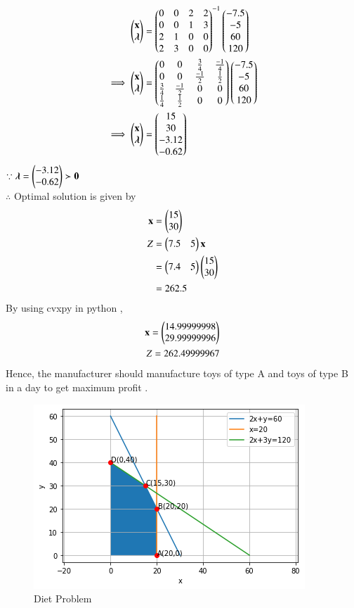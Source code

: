 \documentclass[journal,12pt,twocolumn]{IEEEtran}
\begin{document}
\begin{align}
    \begin{pmatrix}\mathbf{x} \\ \boldsymbol{\lambda}\end{pmatrix} &= \begin{pmatrix}0 & 0 & 2 & 2 \\ 0 & 0 & 1 & 3 \\ 2 & 1 & 0 & 0 \\ 2 & 3 & 0 & 0\end{pmatrix}^{-1}\begin{pmatrix}-7.5 \\ -5 \\ 60 \\ 120\end{pmatrix}
    \\
    \implies   \begin{pmatrix}\mathbf{x} \\ \boldsymbol{\lambda}\end{pmatrix} &= \begin{pmatrix}0 & 0 & \frac{3}{4} & \frac{-1}{4} \\ 0 & 0 & \frac{-1}{2} & \frac{1}{2} \\ \frac{3}{4} & \frac{-1}{2} & 0 & 0 \\ \frac{1}{4} & \frac{1}{2} & 0 & 0\end{pmatrix}\begin{pmatrix}-7.5 \\ -5 \\ 60 \\ 120\end{pmatrix}
    \\
    \implies \begin{pmatrix}\mathbf{x} \\ \boldsymbol{\lambda}\end{pmatrix} &= \begin{pmatrix}15 \\ 30 \\ -3.12 \\ -0.62\end{pmatrix}
\end{align}
$\because \boldsymbol{\lambda}=\begin{pmatrix}-3.12 \\ -0.62\end{pmatrix} \succ \mathbf{0} $
\\
$\therefore$ Optimal solution is given by
\begin{align}
    \mathbf{x} &= \begin{pmatrix}15\\30\end{pmatrix} \\
    Z &= \begin{pmatrix}7.5 & 5\end{pmatrix}\mathbf{x} \\
    &= \begin{pmatrix}7.4 & 5\end{pmatrix}\begin{pmatrix}15 \\ 30\end{pmatrix} \\
    &= 262.5
\end{align}
By using cvxpy in python ,
\begin{align}
    \mathbf{x}=\begin{pmatrix}14.99999998\\29.99999996\end{pmatrix}\\
    Z = 262.49999967
\end{align}
Hence, the manufacturer should manufacture  toys of type A and  toys of type B in a day to get maximum profit .
\begin{figure}[!ht]
\centering
\includegraphics[width=\columnwidth]{Figure10}
\caption{Diet Problem}
\label{fig:toy problem}	
\end{figure}
\end{document}
